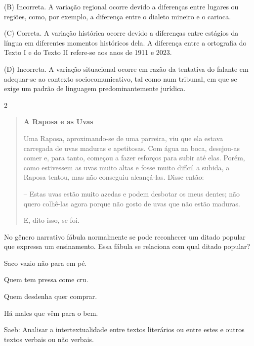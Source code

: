 (B) Incorreta. A variação regional ocorre devido a diferenças entre
lugares ou regiões, como, por exemplo, a diferença entre o dialeto
mineiro e o carioca.

(C) Correta. A variação histórica ocorre devido a diferenças entre
estágios da língua em diferentes momentos históricos dela. A diferença
entre a ortografia do Texto I e do Texto II refere-se aos anos de 1911 e
2023.

(D) Incorreta. A variação situacional ocorre em razão da tentativa do
falante em adequar-se ao contexto sociocomunicativo, tal como num
tribunal, em que se exige um padrão de linguagem predominantemente
jurídica.

\num{2}

\begin{quote}
\textbf{A Raposa e as Uvas}

Uma Raposa, aproximando-se de uma parreira, viu que ela estava carregada
de uvas maduras e apetitosas. Com água na boca, desejou-as comer e, para
tanto, começou a fazer esforços para subir até elas. Porém, como
estivessem as uvas muito altas e fosse muito difícil a subida, a Raposa
tentou, mas não conseguiu alcançá-las. Disse então:

-- Estas uvas estão muito azedas e podem desbotar os meus dentes; não
quero colhê-las agora porque não gosto de uvas que não estão maduras.

E, dito isso, se foi.
\end{quote}


No gênero narrativo fábula normalmente se pode reconhecer um ditado
popular que expressa um ensinamento. Essa fábula se relaciona com qual
ditado popular?

\begin{escolha}
\item Saco vazio não para em pé.

\item Quem tem pressa come cru.

\item Quem desdenha quer comprar.

\item Há males que vêm para o bem.
\end{escolha}

Saeb: Analisar a intertextualidade entre textos literários ou entre
estes e outros textos verbais ou não verbais.


